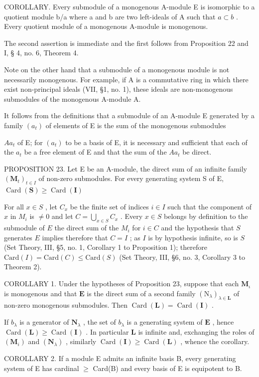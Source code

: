 COROLLARY. Every submodule of a monogenous A-module E is isomorphic to a quotient module b/a where a and b are two left-ideals of A such that \(a \subset b\) . Every quotient module of a monogenous A-module is monogenous.

The second assertion is immediate and the first follows from Proposition 22 and I, § 4, no. 6, Theorem 4.

Note on the other hand that a submodule of a monogenous module is not necessarily monogenous. For example, if A is a commutative ring in which there exist non-principal ideals (VII, §1, no. 1), these ideals are non-monogenous submodules of the monogenous A-module A.

It follows from the definitions that a submodule of an A-module E generated by a family \((a_{t})\) of elements of E is the sum of the monogenous submodules

\(Aa_{t}\) of E; for \((a_{t})\) to be a basis of E, it is necessary and sufficient that each of the \(a_{t}\) be a free element of E and that the sum of the \(Aa_{t}\) be direct.

PROPOSITION 23. Let E be an A-module, the direct sum of an infinite family \((\mathbf{M}_t)_{t\in I}\) of non-zero submodules. For every generating system S of E, \(\operatorname{Card}(\mathbf{S})\geqslant \operatorname{Card}(\mathbf{I})\)

For all \(x \in S\) , let \(C_x\) be the finite set of indices \(i \in I\) such that the component of \(x\) in \(M_i\) is \(\neq 0\) and let \(C = \bigcup_{x \in S} C_x\) . Every \(x \in S\) belongs by definition to the submodule of \(E\) the direct sum of the \(M_i\) for \(i \in C\) and the hypothesis that \(S\) generates \(E\) implies therefore that \(C = I\) ; as \(I\) is by hypothesis infinite, so is \(S\) (Set Theory, III, §5, no. 1, Corollary 1 to Proposition 1); therefore \(\text{Card}(I) = \text{Card}(C) \leqslant \text{Card}(S)\) (Set Theory, III, §6, no. 3, Corollary 3 to Theorem 2).

COROLLARY 1. Under the hypotheses of Proposition 23, suppose that each \(\mathbf{M}_{\iota}\) is monogenous and that \(\mathbf{E}\) is the direct sum of a second family \((\mathrm{N}_{\lambda})_{\lambda \in \mathbf{L}}\) of non-zero monogenous submodules. Then \(\operatorname{Card}(\mathbf{L}) = \operatorname{Card}(\mathbf{I})\) .

If \(b_{\lambda}\) is a generator of \(\mathbf{N}_{\lambda}\) , the set of \(b_{\lambda}\) is a generating system of \(\mathbf{E}\) , hence \(\operatorname{Card}(\mathbf{L}) \geqslant \operatorname{Card}(\mathbf{I})\) . In particular \(\mathbf{L}\) is infinite and, exchanging the roles of \((\mathbf{M}_i)\) and \((\mathbf{N}_{\lambda})\) , similarly \(\operatorname{Card}(\mathbf{I}) \geqslant \operatorname{Card}(\mathbf{L})\) , whence the corollary.

COROLLARY 2. If a module E admits an infinite basis B, every generating system of E has cardinal \(\geqslant\) Card(B) and every basis of E is equipotent to B.

